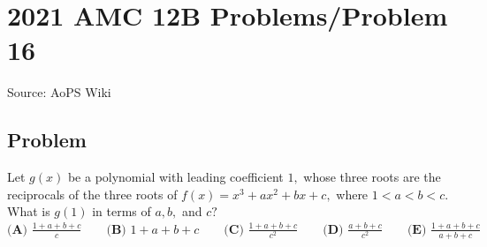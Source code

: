\documentclass[12pt]{article}
\begin{document}
\section*{{2021 AMC 12B Problems/Problem 16}}
Source: AoPS Wiki

\subsection*{Problem}
Let $g(x)$ be a polynomial with leading coefficient $1,$ whose three roots are the reciprocals of the three roots of $f(x)=x^3+ax^2+bx+c,$ where $1<a<b<c.$ What is $g(1)$ in terms of $a,b,$ and $c?$ $\textbf{(A) }\frac{1+a+b+c}c \qquad \textbf{(B) }1+a+b+c \qquad \textbf{(C) }\frac{1+a+b+c}{c^2}\qquad \textbf{(D) }\frac{a+b+c}{c^2} \qquad \textbf{(E) }\frac{1+a+b+c}{a+b+c}$
\end{document}

